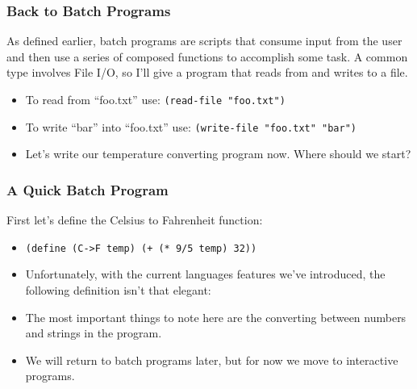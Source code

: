 \documentclass{beamer}
\begin{document}
\begin{frame}
  \frametitle{Back to Batch Programs}
  As defined earlier, batch programs are scripts that consume input from the
  user and then use a series of composed functions to accomplish some task.
  A common type involves File I/O, so I'll give a program that reads from and
  writes to a file.
  \begin{itemize}
  \item<2-> To read from ``foo.txt'' use: \texttt{(read-file "foo.txt")}
  \item<3-> To write ``bar'' into ``foo.txt'' use: \texttt{(write-file "foo.txt" "bar")}
  \item<4-> Let's write our temperature converting program now. Where should we start? 
  \end{itemize}  
\end{frame}


\begin{frame}
  \frametitle{A Quick Batch Program}
  First let's define the Celsius to Fahrenheit function:
  \begin{itemize}
  \item<2-> \texttt{(define (C->F temp) (+ (* 9/5 temp) 32))}
  \item<3-> Unfortunately, with the current languages features we've introduced,
    the following definition isn't that elegant: \convert
  \item<4-> The most important things to note here are the converting between
    numbers and strings in the program.
  \item<5-> We will return to batch programs later, but for now we move to interactive programs.
  \end{itemize}
\end{frame}
\end{document}
